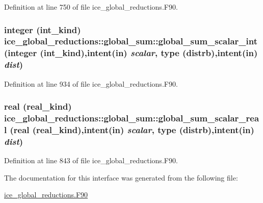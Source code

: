 Definition at line 750 of file ice\_\-global\_\-reductions.F90.\hypertarget{interfaceice__global__reductions_1_1global__sum_a3555f8d28d69c88ae230f621c236367e}{
\subsubsection[{global\_\-sum\_\-scalar\_\-int}]{\setlength{\rightskip}{0pt plus 5cm}integer (int\_\-kind) ice\_\-global\_\-reductions::global\_\-sum::global\_\-sum\_\-scalar\_\-int (integer (int\_\-kind),intent(in) {\em scalar}, \/  type ({\bf distrb}),intent(in) {\em dist})}}
\label{interfaceice__global__reductions_1_1global__sum_a3555f8d28d69c88ae230f621c236367e}


Definition at line 934 of file ice\_\-global\_\-reductions.F90.\hypertarget{interfaceice__global__reductions_1_1global__sum_aef81b51d3b8ad33123f117c90349337c}{
\subsubsection[{global\_\-sum\_\-scalar\_\-real}]{\setlength{\rightskip}{0pt plus 5cm}real (real\_\-kind) ice\_\-global\_\-reductions::global\_\-sum::global\_\-sum\_\-scalar\_\-real (real (real\_\-kind),intent(in) {\em scalar}, \/  type ({\bf distrb}),intent(in) {\em dist})}}
\label{interfaceice__global__reductions_1_1global__sum_aef81b51d3b8ad33123f117c90349337c}


Definition at line 843 of file ice\_\-global\_\-reductions.F90.

The documentation for this interface was generated from the following file:\begin{DoxyCompactItemize}
\item 
\hyperlink{ice__global__reductions_8F90}{ice\_\-global\_\-reductions.F90}\end{DoxyCompactItemize}
